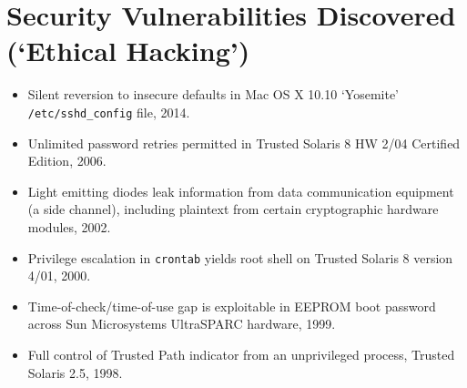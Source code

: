 \vspace{2mm}
\section*{Security Vulnerabilities Discovered (`Ethical Hacking')}

\vspace{-2mm}
\begin{itemize}
    \item Silent reversion to insecure defaults in Mac OS X 10.10 `Yosemite'
        \texttt{/etc/sshd\_config} file, 2014.\vspace{-2mm}
	\item Unlimited password retries permitted in Trusted Solaris 8 HW 2/04
		Certified Edition, 2006.\vspace{-2mm}
	\item Light emitting diodes leak information from data
        communication equipment (a side channel), including plaintext from
		certain cryptographic hardware modules, 2002.\vspace{-2mm}
	\item Privilege escalation in \verb,crontab, yields root shell on Trusted
		Solaris 8 version 4/01, 2000.\vspace{-2mm}
    \item Time-of-check/time-of-use gap is exploitable in EEPROM boot
        password across Sun Microsystems UltraSPARC hardware, 1999.\vspace{-2mm}
    \item Full control of Trusted Path indicator from an unprivileged process,
        Trusted Solaris 2.5, 1998.\vspace{-2mm}
\end{itemize}

